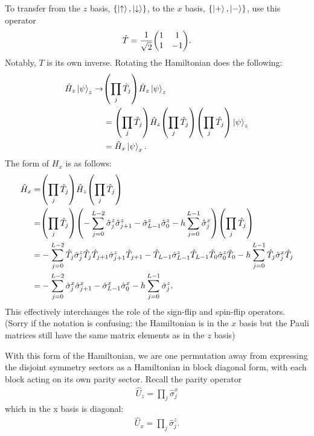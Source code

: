 \documentclass{article}
\begin{document}
To transfer from the $z$ basis, $\{\ket{\uparrow}, \ket{\downarrow} \}$,
to the $x$ basis, $\{\ket{+}, \ket{-}\}$, use this operator
\begin{align}
    \hat T = \frac{1}{\sqrt{2}} \mqty( 1 & 1 \\ 1 & -1 ).
\end{align}
Notably, $T$ is its own inverse. 
Rotating the Hamiltonian does the following:
\begin{align}
    \hat H_z \ket{\psi}_z
        \to& \qty( \prod_j \hat T_j ) \hat H_z \ket{\psi}_z
    \\
    &= \qty( \prod_j \hat T_j ) \hat H_z \qty( \prod_j \hat T_j )
        \qty( \prod_j \hat T_j ) \ket{\psi}_z 
    \\
    &= \hat H_x \ket{\psi}_x.
\end{align}
The form of $H_x$ is as follows:
\begin{align}
    \hat H_x =& \qty( \prod_j \hat T_j ) \hat H_z \qty( \prod_j \hat T_j )
    \\
    =& \qty( \prod_j \hat T_j )
        \qty( -\sum_{j=0}^{L-2} \hat \sigma^z_{j} \hat \sigma^z_{j+1} 
            - \hat \sigma^z_{L-1} \hat \sigma^z_{0}
            -h \sum_{j=0}^{L-1} \hat \sigma^x_{j})
        \qty( \prod_j \hat T_j )
    \\
    =& -\sum_{j=0}^{L-2} \hat T_j \hat \sigma^z_{j} \hat T_j
                        \hat T_{j+1} \hat \sigma^z_{j+1} \hat T_{j+1}
        - \hat T_{L-1} \hat \sigma^z_{L-1} \hat T_{L-1} 
             \hat T_{0}  \hat \sigma^z_{0} \hat T_{0} 
        -h \sum_{j=0}^{L-1}  \hat T_{j} \hat \sigma^x_{j} \hat T_{j}
    \\
    =& -\sum_{j=0}^{L-2} \hat \sigma^x_{j} \hat \sigma^x_{j+1}
        - \hat \sigma^x_{L-1} \hat \sigma^x_{0} 
        -h \sum_{j=0}^{L-1}  \hat \sigma^z_{j}.
\end{align}
This effectively interchanges the role of the sign-flip and spin-flip operators.
(Sorry if the notation is confusing: the Hamiltonian is in the $x$ basis but
the Pauli matrices still have the same matrix elements as in the $z$ basis)

With this form of the Hamiltonian, we are one permutation away from expressing
the disjoint symmetry sectors as a Hamiltonian in block diagonal form, with each
block acting on its own parity sector.
Recall the parity operator 
\begin{align}
    \hat U_z = \prod_j \hat \sigma_{j}^x
\end{align}
which in the x basis is diagonal:
\begin{align}
    \hat U_x = \prod_j \hat \sigma_{j}^z.
\end{align}
\end{document}
